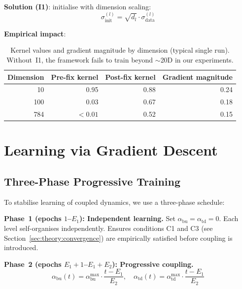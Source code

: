 \documentclass[11pt,a4paper]{article}
\begin{document}
\textbf{Solution (I1)}: initialise with dimension scaling:
\begin{equation}
  \sigma^{(l)}_{\mathrm{init}} = \sqrt{d_l} \cdot \sigma^{(l)}_{\mathrm{data}}
\end{equation}

\textbf{Empirical impact}:

\begin{table}[h]
\centering
\begin{tabular}{rrrr}
\toprule
\textbf{Dimension} & \textbf{Pre-fix kernel} & \textbf{Post-fix kernel} & \textbf{Gradient magnitude} \\
\midrule
10  & 0.95     & 0.88 & 0.24 \\
100 & 0.03     & 0.67 & 0.18 \\
784 & $<0.01$  & 0.52 & 0.15 \\
\bottomrule
\end{tabular}
\caption{Kernel values and gradient magnitude by dimension (typical single run).
Without~I1, the framework fails to train beyond $\sim$20D in our experiments.}
\label{tab:kernelfix}
\end{table}

\section{Learning via Gradient Descent}

\subsection{Three-Phase Progressive Training}

To stabilise learning of coupled dynamics, we use a three-phase schedule:

\textbf{Phase~1 (epochs $1$--$E_1$): Independent learning.}
Set $\alpha_{\mathrm{bu}} = \alpha_{\mathrm{td}} = 0$. Each level self-organises
independently. Ensures conditions C1 and C3 (see Section~\ref{sec:theory:convergence}) are
empirically satisfied before coupling is introduced.

\textbf{Phase~2 (epochs $E_1+1$--$E_1+E_2$): Progressive coupling.}
\begin{equation}
  \alpha_{\mathrm{bu}}(t) = \alpha_{\mathrm{bu}}^{\max} \cdot \frac{t - E_1}{E_2},
  \quad
  \alpha_{\mathrm{td}}(t) = \alpha_{\mathrm{td}}^{\max} \cdot \frac{t - E_1}{E_2}
\end{equation}
\end{document}
